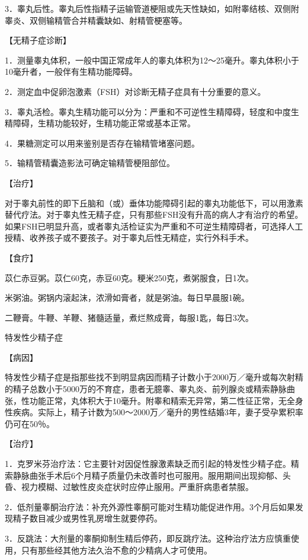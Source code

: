 \documentclass[12pt,UTF8]{ctexbook}
\begin{document}
3．睾丸后性。睾丸后性指精子运输管道梗阻或先天性缺如，如附睾结核、双侧附睾炎、双侧输精管合并精囊缺如、射精管梗塞等。

【无精子症诊断】

1．测量睾丸体积，一般中国正常成年人的睾丸体积为12～25毫升。睾丸体积小于10毫升者，一般伴有生精功能障碍。

2．测定血中促卵泡激素（FSH）对诊断无精子症具有十分重要的意义。

3．睾丸活检。睾丸生精功能可以分为：严重和不可逆性生精障碍，轻度和中度生精障碍，生精功能较好，生精功能正常或基本正常。

4．果糖测定可以用来鉴别是否存在输精管堵塞问题。

5．输精管精囊造影法可确定输精管梗阻部位。

【治疗】

对于睾丸前性的即下丘脑和（或）垂体功能障碍引起的睾丸功能低下，可以用激素替代疗法。对于睾丸性无精子症，只有那些FSH没有升高的病人才有治疗的希望。如果FSH已明显升高，或者睾丸活检证实为严重和不可逆生精障碍者，可选择人工授精、收养孩子或不要孩子。对于睾丸后性无精症，实行外科手术。

【食疗】

苡仁赤豆粥。苡仁60克，赤豆60克。粳米250克，煮粥服食，日1次。

米粥油。粥锅内滚起沫，浓滑如膏者，就是粥油。每日早晨服1碗。

二鞭膏。牛鞭、羊鞭、猪髓适量，煮烂熬成膏，每服1匙，每日3次。





特发性少精子症


【病因】

特发性少精子症是指那些找不到明显病因而精子计数小于2000万／毫升或每次射精的精子总数小于5000万的不育症，患者无臆睾、睾丸炎、前列腺炎或精索静脉曲张，性功能正常，丸体积大于10毫升。附睾和精索无异常，第二性征正常，无全身性疾病。实际上，精子计数为500～2000万／毫升的男性结婚3年，妻子受孕累积率仍可在50％。

【治疗】

1．克罗米芬治疗法：它主要针对因促性腺激素缺乏而引起的特发性少精子症。精索静脉曲张手术后6个月精子质量仍未改善时也可服用。服用期间出现抑郁、头昏、视力模糊、过敏性皮炎症状时应停止服用。严重肝病患者禁服。

2．低剂量睾酮治疗法：补充外源性睾酮可能对生精功能促进作用。3个月后如果发现精子数目减少或男性乳房增生就要停药。

3．反跳法：大剂量的睾酮抑制生精后停药，即反跳疗法。这种治疗法方应慎重使用，只有那些经其他方法久治不愈的少精病人才可使用。
\end{document}

